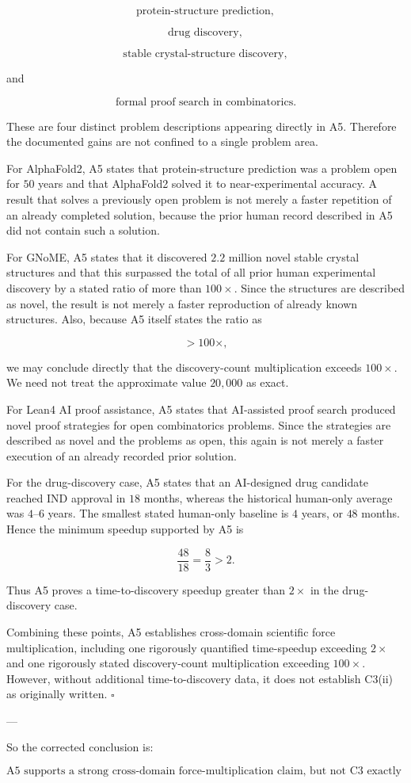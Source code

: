 \[
\text{protein-structure prediction},
\]

\[
\text{drug discovery},
\]

\[
\text{stable crystal-structure discovery},
\]

and

\[
\text{formal proof search in combinatorics}.
\]

These are four distinct problem descriptions appearing directly in A5. Therefore the documented gains are not confined to a single problem area.

For AlphaFold2, A5 states that protein-structure prediction was a problem open for \(50\) years and that AlphaFold2 solved it to near-experimental accuracy. A result that solves a previously open problem is not merely a faster repetition of an already completed solution, because the prior human record described in A5 did not contain such a solution.

For GNoME, A5 states that it discovered \(2.2\) million novel stable crystal structures and that this surpassed the total of all prior human experimental discovery by a stated ratio of more than \(100\times\). Since the structures are described as novel, the result is not merely a faster reproduction of already known structures. Also, because A5 itself states the ratio as

\[
>100\times,
\]

we may conclude directly that the discovery-count multiplication exceeds \(100\times\). We need not treat the approximate value \(20{,}000\) as exact.

For Lean4 AI proof assistance, A5 states that AI-assisted proof search produced novel proof strategies for open combinatorics problems. Since the strategies are described as novel and the problems as open, this again is not merely a faster execution of an already recorded prior solution.

For the drug-discovery case, A5 states that an AI-designed drug candidate reached IND approval in \(18\) months, whereas the historical human-only average was \(4\)--\(6\) years. The smallest stated human-only baseline is \(4\) years, or \(48\) months. Hence the minimum speedup supported by A5 is

\[
\frac{48}{18}=\frac{8}{3}>2.
\]

Thus A5 proves a time-to-discovery speedup greater than \(2\times\) in the drug-discovery case.

Combining these points, A5 establishes cross-domain scientific force multiplication, including one rigorously quantified time-speedup exceeding \(2\times\) and one rigorously stated discovery-count multiplication exceeding \(100\times\). However, without additional time-to-discovery data, it does not establish C3(ii) as originally written. \(\square\)

---

So the corrected conclusion is:

\[
\boxed{\text{A5 supports a strong cross-domain force-multiplication claim, but not C3 exactly as stated.}}
\]